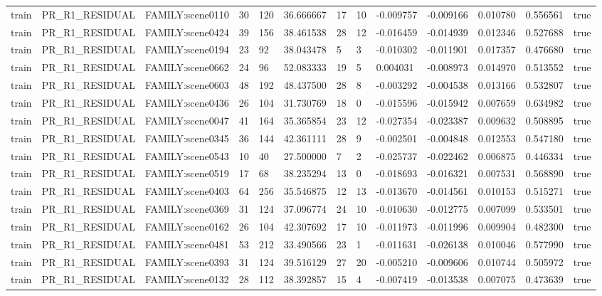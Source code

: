 \begin{tabular}{lllllllllllll}
train & PR\_R1\_RESIDUAL & FAMILY:scene0110 & 30 & 120 & 36.666667 & 17 & 10 & -0.009757 & -0.009166 & 0.010780 & 0.556561 & true \\
train & PR\_R1\_RESIDUAL & FAMILY:scene0424 & 39 & 156 & 38.461538 & 28 & 12 & -0.016459 & -0.014939 & 0.012346 & 0.527688 & true \\
train & PR\_R1\_RESIDUAL & FAMILY:scene0194 & 23 & 92 & 38.043478 & 5 & 3 & -0.010302 & -0.011901 & 0.017357 & 0.476680 & true \\
train & PR\_R1\_RESIDUAL & FAMILY:scene0662 & 24 & 96 & 52.083333 & 19 & 5 & 0.004031 & -0.008973 & 0.014970 & 0.513552 & true \\
train & PR\_R1\_RESIDUAL & FAMILY:scene0603 & 48 & 192 & 48.437500 & 28 & 8 & -0.003292 & -0.004538 & 0.013166 & 0.532807 & true \\
train & PR\_R1\_RESIDUAL & FAMILY:scene0436 & 26 & 104 & 31.730769 & 18 & 0 & -0.015596 & -0.015942 & 0.007659 & 0.634982 & true \\
train & PR\_R1\_RESIDUAL & FAMILY:scene0047 & 41 & 164 & 35.365854 & 23 & 12 & -0.027354 & -0.023387 & 0.009632 & 0.508895 & true \\
train & PR\_R1\_RESIDUAL & FAMILY:scene0345 & 36 & 144 & 42.361111 & 28 & 9 & -0.002501 & -0.004848 & 0.012553 & 0.547180 & true \\
train & PR\_R1\_RESIDUAL & FAMILY:scene0543 & 10 & 40 & 27.500000 & 7 & 2 & -0.025737 & -0.022462 & 0.006875 & 0.446334 & true \\
train & PR\_R1\_RESIDUAL & FAMILY:scene0519 & 17 & 68 & 38.235294 & 13 & 0 & -0.018693 & -0.016321 & 0.007531 & 0.568890 & true \\
train & PR\_R1\_RESIDUAL & FAMILY:scene0403 & 64 & 256 & 35.546875 & 12 & 13 & -0.013670 & -0.014561 & 0.010153 & 0.515271 & true \\
train & PR\_R1\_RESIDUAL & FAMILY:scene0369 & 31 & 124 & 37.096774 & 24 & 10 & -0.010630 & -0.012775 & 0.007099 & 0.533501 & true \\
train & PR\_R1\_RESIDUAL & FAMILY:scene0162 & 26 & 104 & 42.307692 & 17 & 10 & -0.011973 & -0.011996 & 0.009904 & 0.482300 & true \\
train & PR\_R1\_RESIDUAL & FAMILY:scene0481 & 53 & 212 & 33.490566 & 23 & 1 & -0.011631 & -0.026138 & 0.010046 & 0.577990 & true \\
train & PR\_R1\_RESIDUAL & FAMILY:scene0393 & 31 & 124 & 39.516129 & 27 & 20 & -0.005210 & -0.009606 & 0.010744 & 0.505972 & true \\
train & PR\_R1\_RESIDUAL & FAMILY:scene0132 & 28 & 112 & 38.392857 & 15 & 4 & -0.007419 & -0.013538 & 0.007075 & 0.473639 & true \\

\end{tabular}
